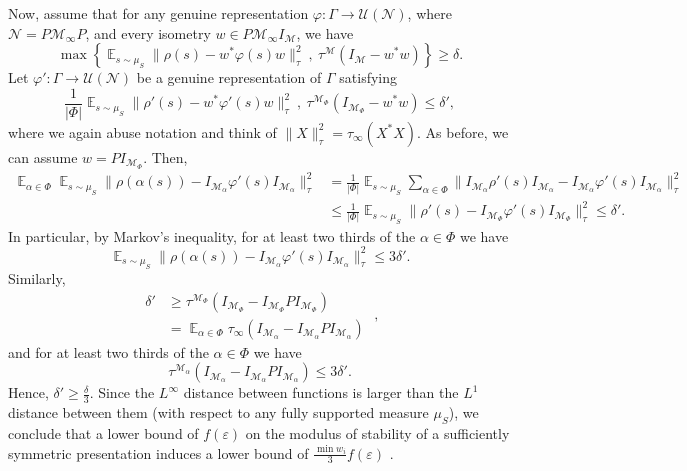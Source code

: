 \documentclass[11pt]{article}
\theoremstyle{definition}
\newcommand{\Id}{\ensuremath{I}}
\DeclareMathOperator*{\Expectation}{\mathbb{E}}
\newcommand{\mM}{\ensuremath{\mathcal{M}}}
\newcommand{\mU}{\ensuremath{\mathcal{U}}}
\newcommand{\eps}{\varepsilon}
\newcommand{\mN}{\mathcal{N}}
\begin{document}
Now, assume that for any genuine representation $\varphi\colon \Gamma\to \mU(\mN)$, where $\mN=P\mM_\infty P$, and every isometry $w\in P\mM_\infty \Id_\mM$, we have 
\[
\max\left\{\Expectation_{s\sim \mu_S} \|\rho(s)-w^*\varphi(s)w\|_\tau^2\ ,\ \tau^\mM(\Id_\mM-w^*w)\right\}\geq \delta.
\]
Let $\varphi'\colon \Gamma\to \mU(\mN)$ be a genuine representation of $\Gamma$ satisfying 
\[
\frac{1}{|\Phi|}\Expectation_{s\sim \mu_S} \|\rho'(s)-w^*\varphi'(s)w\|_\tau^2\ ,\ \tau^{\mM_\Phi}(\Id_{\mM_\Phi}-w^*w)\leq  \delta',
\]
where we again abuse notation and think of $\|X\|_\tau^2=\tau_\infty(X^*X)$.
As before, we can assume $w=PI_{\mM_\Phi}$. Then,
\[
\begin{split}
    \Expectation_{\alpha\in \Phi}\Expectation_{s\sim \mu_S} \|\rho(\alpha(s))-\Id_{\mM_\alpha}\varphi'(s)\Id_{\mM_\alpha}\|_\tau^2&=\frac{1}{|\Phi|}\Expectation_{s\sim \mu_S}\sum_{\alpha\in \Phi}\|\Id_{\mM_\alpha}\rho'(s)\Id_{\mM_\alpha}-\Id_{\mM_\alpha}\varphi'(s)\Id_{\mM_\alpha}\|_\tau^2 \\
    &\leq \frac{1}{|\Phi|}\Expectation_{s\sim \mu_S}\|\rho'(s)-\Id_{\mM_\Phi}\varphi'(s)\Id_{\mM_\Phi}\|_\tau^2\leq \delta'.
\end{split}
\]
In particular, by Markov's inequality, for at least two thirds of the $\alpha\in \Phi$ we have 
\[
\Expectation_{s\sim \mu_S} \|\rho(\alpha(s))-\Id_{\mM_\alpha}\varphi'(s)\Id_{\mM_\alpha}\|_\tau^2\leq 3\delta'.
\]
Similarly,
\[
\begin{split}
    \delta'&\geq \tau^{\mM_\Phi}(\Id_{\mM_\Phi}-\Id_{\mM_\Phi}P\Id_{\mM_\Phi})\\
    &=\Expectation_{\alpha\in\Phi}\tau_\infty(\Id_{\mM_\alpha}-\Id_{\mM_\alpha}P\Id_{\mM_\alpha})
\end{split}\;,
\]
and for at least two thirds of the $\alpha\in \Phi$ we have 
\[
\tau^{\mM_\alpha}(\Id_{\mM_\alpha}-\Id_{\mM_\alpha}P\Id_{\mM_\alpha})\leq 3\delta'.
\]
Hence, $\delta'\geq \frac{\delta}{3}$.
Since the $L^\infty$ distance between functions is larger than the $L^1$ distance between them (with respect to any fully supported measure $\mu_S$), we conclude that a lower bound of $f(\eps)$ on the modulus of stability of a sufficiently symmetric presentation induces a lower bound of $\frac{\min{w_i}}{3}f(\eps)$ .



\notesendofpaper
\end{document}
